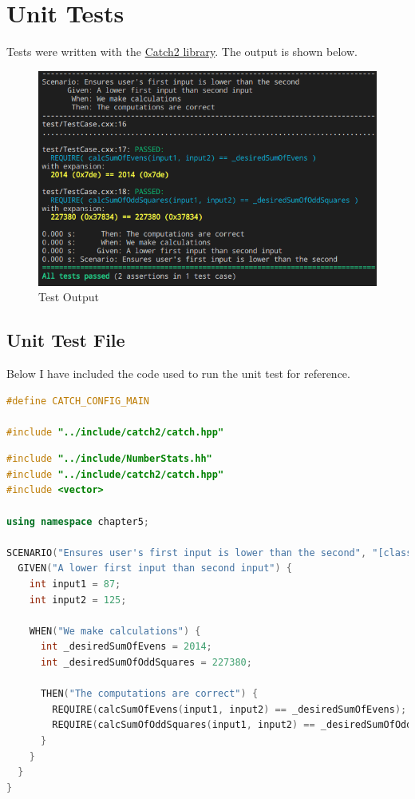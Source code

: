 \documentclass[a4paper, 11pt]{article}
\begin{document}
  \newpage
  \section{Unit Tests}
    Tests were written with the
      \href{https://github.com/catchorg/catch}{Catch2 library}. The output is
      shown below.

    \begin{figure}[H]
      \caption{Test Output}
      \centering
      \includegraphics[width=\textwidth]{testout.png}
    \end{figure}

    \subsection{Unit Test File}
      Below I have included the code used to run the unit test for reference.

      \begin{lstlisting}[language=c++,caption={catch\_main.cxx}]
#define CATCH_CONFIG_MAIN

#include "../include/catch2/catch.hpp"
      \end{lstlisting}

      \begin{lstlisting}[language=c++,caption={TestCase.cxx}]
#include "../include/NumberStats.hh"
#include "../include/catch2/catch.hpp"
#include <vector>

using namespace chapter5;

SCENARIO("Ensures user's first input is lower than the second", "[class]") {
  GIVEN("A lower first input than second input") {
    int input1 = 87;
    int input2 = 125;

    WHEN("We make calculations") {
      int _desiredSumOfEvens = 2014;
      int _desiredSumOfOddSquares = 227380;

      THEN("The computations are correct") {
        REQUIRE(calcSumOfEvens(input1, input2) == _desiredSumOfEvens);
        REQUIRE(calcSumOfOddSquares(input1, input2) == _desiredSumOfOddSquares);
      }
    }
  }
}
      \end{lstlisting}
\end{document}
